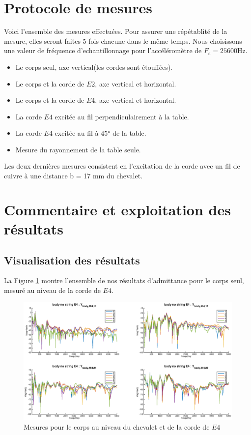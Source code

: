 
\section{Protocole de mesures}
Voici l'ensemble des mesures effectuées. Pour assurer une répétablité de la mesure, elles seront faites 5 fois chacune dans le même temps. Nous choisissons une valeur de fréquence d'echantillonnage pour l'accéléromètre de  $F_e = \si{25600\Hz}$.
\begin{itemize}
\item Le corps seul, axe vertical(les cordes sont étouffées).
\item Le corps et la corde de \( E2 \), axe vertical et horizontal.
\item Le corps et la corde de \( E4 \), axe vertical et horizontal.
\item La corde \( E4 \) excitée au fil perpendiculairement à la table.
\item La corde \( E4 \) excitée au fil à \( \si{45 \degree} \) de la table.
\item Mesure du rayonnement de la table seule.
\end{itemize}
Les deux dernières mesures consistent en l'excitation de la corde avec un fil de cuivre à une distance b = 17 mm du chevalet. 

\section{Commentaire et exploitation des résultats}
\subsection{Visualisation des résultats}
La Figure \ref{fig:goll} montre l'ensemble de nos résultats d'admittance pour le corps seul, mesuré au niveau de la corde de \( E4 \).

\begin{figure}[hpbt]
\centering
\includegraphics[width = \linewidth]{figures/Y_body_E4.eps}
\caption{Mesures pour le corps au niveau du chevalet et de la corde de \( E4 \)}
\label{fig:goll}
\end{figure}

